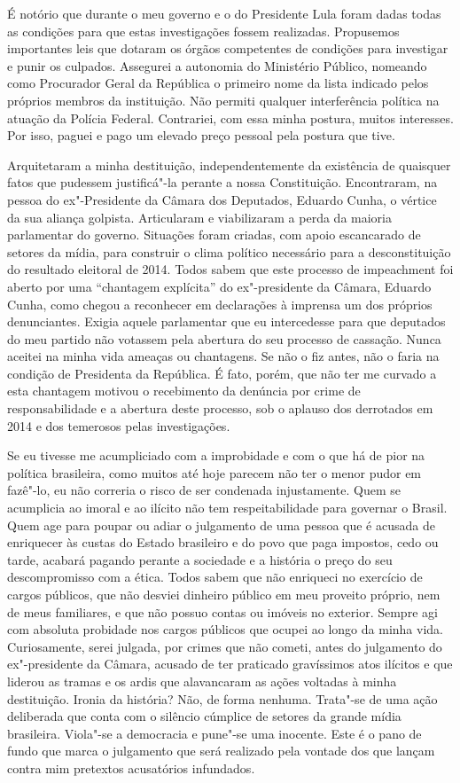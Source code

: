 É notório que durante o meu governo e o do Presidente Lula foram dadas
todas as condições para que estas investigações fossem realizadas.
Propusemos importantes leis que dotaram os órgãos competentes de
condições para investigar e punir os culpados. Assegurei a autonomia do
Ministério Público, nomeando como Procurador Geral da República o
primeiro nome da lista indicado pelos próprios membros da instituição.
Não permiti qualquer interferência política na atuação da Polícia
Federal. Contrariei, com essa minha postura, muitos interesses. Por
isso, paguei e pago um elevado preço pessoal pela postura que tive.

Arquitetaram a minha destituição, independentemente da existência de
quaisquer fatos que pudessem justificá"-la perante a nossa Constituição.
Encontraram, na pessoa do ex"-Presidente da Câmara dos Deputados, Eduardo
Cunha, o vértice da sua aliança golpista. Articularam e viabilizaram a
perda da maioria parlamentar do governo. Situações foram criadas, com
apoio escancarado de setores da mídia, para construir o clima político
necessário para a desconstituição do resultado eleitoral de 2014. Todos
sabem que este processo de impeachment foi aberto por uma ``chantagem
explícita'' do ex"-presidente da Câmara, Eduardo Cunha, como chegou a
reconhecer em declarações à imprensa um dos próprios denunciantes.
Exigia aquele parlamentar que eu intercedesse para que deputados do meu
partido não votassem pela abertura do seu processo de cassação. Nunca
aceitei na minha vida ameaças ou chantagens. Se não o fiz antes, não o
faria na condição de Presidenta da República. É fato, porém, que não ter
me curvado a esta chantagem motivou o recebimento da denúncia por crime
de responsabilidade e a abertura deste processo, sob o aplauso dos
derrotados em 2014 e dos temerosos pelas investigações.

Se eu tivesse me
acumpliciado com a improbidade e com o que há de pior na política
brasileira, como muitos até hoje parecem não ter o menor pudor em
fazê"-lo, eu não correria o risco de ser condenada injustamente. Quem se
acumplicia ao imoral e ao ilícito não tem respeitabilidade para
governar o Brasil. Quem age para poupar ou adiar o julgamento de uma
pessoa que é acusada de enriquecer às custas do Estado brasileiro e do
povo que paga impostos, cedo ou tarde, acabará pagando perante a
sociedade e a história o preço do seu descompromisso com a ética. Todos
sabem que não enriqueci no exercício de cargos públicos, que não desviei
dinheiro público em meu proveito próprio, nem de meus familiares, e que
não possuo contas ou imóveis no exterior. Sempre agi com absoluta
probidade nos cargos públicos que ocupei ao longo da minha vida.
Curiosamente, serei julgada, por crimes que não cometi, antes do
julgamento do ex"-presidente da Câmara, acusado de ter praticado
gravíssimos atos ilícitos e que liderou as tramas e os ardis que
alavancaram as ações voltadas à minha destituição. Ironia da história?
Não, de forma nenhuma. Trata"-se de uma ação deliberada que conta com o
silêncio cúmplice de setores da grande mídia brasileira. Viola"-se a
democracia e pune"-se uma inocente. Este é o pano de fundo que marca o
julgamento que será realizado pela vontade dos que lançam contra mim
pretextos acusatórios infundados.

